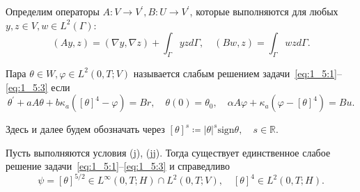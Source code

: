 \begin{frame}
    Определим операторы $A: V \rightarrow V^{\prime}, B: U \rightarrow V^{\prime}$,
    которые выполняются для любых $y, z \in V, w \in L^{2}(\Gamma)$:
    \[
        (A y, z)=(\nabla y, \nabla z)+\int_{\Gamma} y z d \Gamma, \quad(B w, z)=\int_{\Gamma} w z d \Gamma.
    \]

    \begin{definition}
        Пара $\theta \in W, \varphi \in L^{2}(0, T ; V)$
        называется слабым решением задачи~\eqref{eq:1_5:1}--\eqref{eq:1_5:3}
        если
        \begin{equation*}
            \theta^{\prime}+a A \theta+b \kappa_{a}\left([\theta]^{4}-\varphi\right)=B r,
            \quad \theta(0)=\theta_{0}, \quad \alpha A \varphi+\kappa_{a}\left(\varphi-[\theta]^{4}\right)=B u.
        \end{equation*}
    \end{definition}
    Здесь и далее будем обозначать через
    $[\theta]^s \coloneqq |\theta|^s \mathrm{sign}\theta,\quad s \in \mathbb{R}$.
    \begin{lemma}[1.20]
        Пусть выполняются условия (j), (jj).
        Тогда существует единственное слабое решение задачи~\eqref{eq:1_5:1}--\eqref{eq:1_5:3} и справедливо
        \[
            \psi=[\theta]^{5 / 2} \in L^{\infty}(0, T ; H) \cap L^{2}(0, T ; V),
            \quad[\theta]^{4} \in L^{2}(0, T ; H).
        \]
    \end{lemma}
\end{frame}

